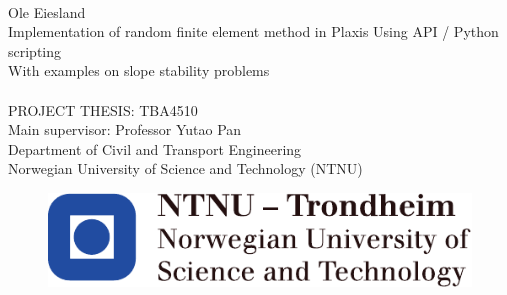 \thispagestyle{empty}
\mbox{}\\[6pc]

\noindent\Large{Ole Eiesland}\\[4pc]
\Huge{Implementation of random finite element method in Plaxis Using API / Python scripting}\\[1pc]
\Large{With examples on slope stability problems}\\[5pc]
\\[2pc]
PROJECT THESIS: TBA4510\\
\large{Main supervisor: Professor Yutao Pan}\\
Department of Civil and Transport Engineering\\
Norwegian University of Science and Technology (NTNU)
\begin{figure}[b!]
   \includegraphics[scale=1.0]{fig/NTNU}
\end{figure}

\vfill



